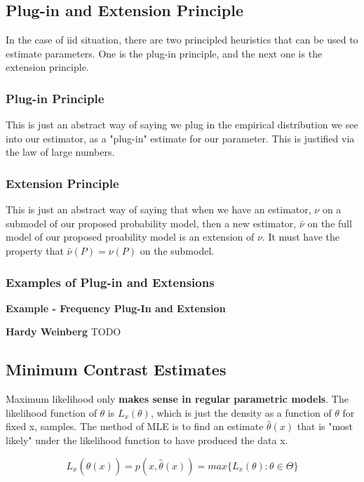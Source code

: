 	\subsection{Plug-in and Extension Principle}
		In the case of iid situation, there are two principled heuristics that can be used to estimate parameters. One is the plug-in principle, and the next one is the extension principle.

		\subsubsection{Plug-in Principle}

			This is just an abstract way of saying we plug in the empirical distribution we see into our estimator, as a "plug-in" estimate for our parameter. This is justified via the law of large numbers.

		\subsubsection{Extension Principle}

			This is just an abstract way of saying that when we have an estimator, $\nu$ on a submodel of our proposed probability model, then a new estimator, $\bar{\nu}$ on the full model of our proposed proability model is an extension of $\nu$. It must have the property that $\bar{\nu}(P) = \nu(P)$ on the submodel. 

		\subsubsection{Examples of Plug-in and Extensions}
			\textbf{Example - Frequency Plug-In and Extension}

			\textbf{Hardy Weinberg}
			TODO

	\subsection{Minimum Contrast Estimates}
		Maximum likelihood only \textbf{makes sense in regular parametric models}. The likelihood function of $\theta$ is $L_x(\theta)$, which is just the density as a function of $\theta$ for fixed x, samples. The method of MLE is to find an estimate $\hat{\theta}(x)$ that is "most likely" under the likelihood function to have produced the data x. 

		$$L_x(\hat{\theta}(x)) = p(x, \hat{\theta}(x)) = max\{L_x(\theta) : \theta \in \Theta\}$$

